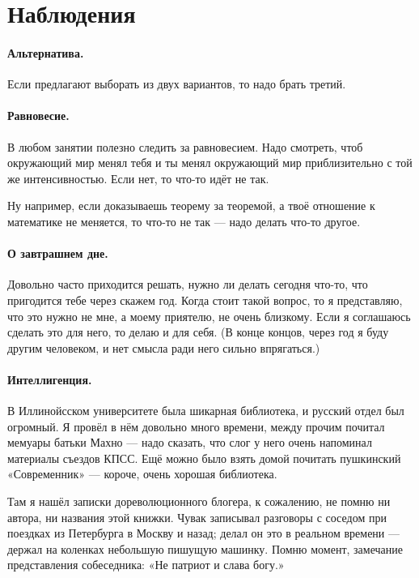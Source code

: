 \documentclass{book}
\begin{document}
\section*{Наблюдения}

\paragraph{Альтернатива.}
Если предлагают выборать из двух вариантов, то надо брать третий.

\paragraph{Равновесие.}
В любом занятии полезно следить за равновесием.
Надо смотреть, чтоб окружающий мир менял тебя и ты менял окружающий мир приблизительно с той же интенсивностью.
Если нет, то что-то идёт не так.

Ну например, если доказываешь теорему за теоремой, а твоё отношение к математике не меняется, то что-то не так --- надо делать что-то другое.

\paragraph{О завтрашнем дне.}
Довольно часто приходится решать, нужно ли делать сегодня что-то, что пригодится тебе через скажем год.
Когда стоит такой вопрос, то я представляю, что это нужно не мне, а  моему приятелю, не очень близкому.
Если я соглашаюсь сделать это для него, то делаю и для себя.
(В конце концов, через год я буду другим человеком, и нет смысла ради него сильно впрягаться.)

\paragraph{Интеллигенция.}
В Иллинойсском университете была шикарная библиотека, и русский отдел был огромный.
Я провёл в нём довольно много времени, между прочим почитал мемуары батьки Махно --- надо сказать, что слог у него очень напоминал материалы съездов КПСС.
Ещё можно было взять домой почитать пушкинский «Современник» --- короче, очень хорошая библиотека.

Там я нашёл записки дореволюционного блогера, к сожалению, не помню ни автора, ни названия этой книжки.
Чувак записывал разговоры с соседом при поездках из Петербурга в Москву и назад;
делал он это в реальном времени --- держал на коленках небольшую пишущую машинку.
Помню момент, замечание представления собеседника: «Не патриот и слава богу.»
\end{document}
